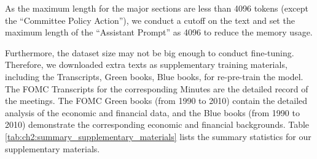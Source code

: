 As the maximum length for the major sections are less than 4096 tokens (except the ``Committee Policy Action''), we conduct a cutoff on the text and set the maximum length of the ``Assistant Prompt'' as 4096 to reduce the memory usage. 


Furthermore, the dataset size may not be big enough to conduct fine-tuning. Therefore, we downloaded extra texts as supplementary training materials, including the Transcripts, Green books, Blue books, for re-pre-train the model. The FOMC Transcripts for the corresponding Minutes are the detailed record of the meetings. The FOMC Green books (from 1990 to 2010) contain the detailed analysis of the economic and financial data, and the Blue books (from 1990 to 2010) demonstrate the corresponding economic and financial backgrounds. Table \ref{tab:ch2:summary_supplementary_materials} lists the summary statistics for our supplementary materials.


